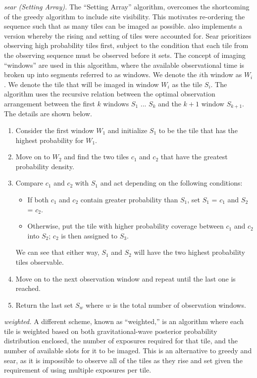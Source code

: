 \documentclass[twocolumn]{aastex62}
\begin{document}
\emph{sear (Setting Array).} The ``Setting Array'' algorithm, overcomes the shortcoming of the greedy algorithm to include site visibility. This motivates re-ordering the sequence such that as many tiles can be imaged as possible.
\cite{RaSi2017} also implements a version whereby the rising and setting of tiles were accounted for. Sear prioritizes observing high probability tiles first, subject to the condition that each tile from the observing sequence must be observed before it sets. The concept of imaging ``windows'' are used in this algorithm, where the available observational time is broken up into segments referred to as windows. We denote the $i$th window as $W_i$. We denote the tile that will be imaged in window $W_i$ as the tile $S_i$. The algorithm uses the recursive relation between the optimal observation arrangement between the first $k$ windows {$S_1$ ... $S_k$} and the $k + 1$ window $S_{k+1}$. The details are shown below. 
\begin{enumerate}
\item Consider the first window $W_1$ and initialize $S_1$ to be the tile that has the highest probability for $W_1$.
\item Move on to $W_2$ and find the two tiles $c_1$ and $c_2$ that have the greatest probability density.
\item Compare $c_1$ and $c_2$ with $S_1$ and act depending on the following conditions:
\begin{itemize}
\item If both $c_1$ and $c_2$ contain greater probability than $S_1$, set $S_1$ = {$c_1$} and $S_2$ = {$c_2$}.
\item Otherwise, put the tile with higher probability coverage between $c_1$ and $c_2$ into $S_2$; $c_2$ is then assigned to $S_3$.
\end{itemize}
We can see that either way, $S_1$ and $S_2$ will have the two highest probability tiles observable.
\item Move on to the next observation window and repeat until the last one is reached.
\item Return the last set $S_w$ where $w$ is the total number of observation windows.
\end{enumerate}

\emph{weighted.} A different scheme, known as ``weighted,'' is an algorithm where each tile is weighted based on both gravitational-wave posterior probability distribution enclosed, the number of exposures required for that tile, and the number of available slots for it to be imaged. This is an alternative to greedy and sear, as it is impossible to observe all of the tiles as they rise and set given the requirement of using multiple exposures per tile. 
\end{document}
